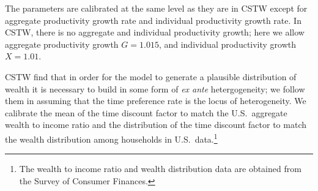 
The parameters are calibrated at the same level as they are in CSTW except for aggregate productivity growth rate and individual productivity growth rate. In CSTW, there is no aggregate and individual productivity growth; here we allow aggregate productivity growth $G=1.015$, and individual productivity growth $X=1.01$.

CSTW find that in order for the model to generate a plausible distribution of wealth it is necessary to build in some form of \textit{ex ante} hetergogeneity; we follow them in assuming that the time preference rate is the locus of heterogeneity. We calibrate the mean of the time discount factor to match the U.S.\ aggregate wealth to income ratio and the distribution of the time discount factor to match the wealth distribution among households in U.S.\ data.\footnote{The wealth to income ratio and wealth distribution data are obtained from the Survey of Consumer Finances.}

